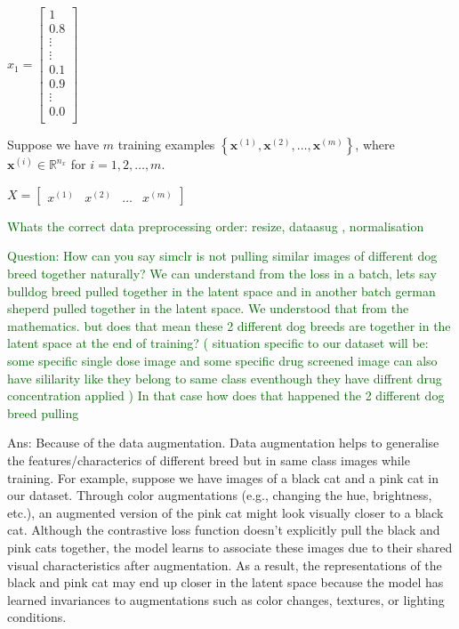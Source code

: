 \documentclass[12pt,twoside,a4paper,parskip]{scrbook} %
\begin{document}
\( x_1 =\left[\begin{array}{c}1 \\ 0.8 \\ \vdots \\ \vdots \\ 0.1 \\ 0.9 \\ \vdots\\ 0.0 \\\end{array}\right] \)

Suppose we have \( m \) training examples \( \left\{ \mathbf{x}^{(1)}, \mathbf{x}^{(2)}, \ldots, \mathbf{x}^{(m)} \right\} \), where \( \mathbf{x}^{(i)} \in \mathbb{R}^{n_{x}} \) for \( i = 1, 2, \ldots, m \).

\( X = \begin{bmatrix} x^{(1)} & x^{(2)} & \dots & x^{(m)} \end{bmatrix} \)

\textcolor{darkgreen}{Whats the correct data preprocessing order: resize, dataasug , normalisation}


\textcolor{darkgreen}{Question: How can you say simclr is not pulling similar images of different dog breed together naturally? We can understand from the loss in a batch, lets say bulldog breed pulled together in the latent space and in another batch german sheperd pulled together in the latent space. We understood that from the mathematics. but does that mean these 2 different dog breeds are together in the latent space at the end of training? ( situation specific to our dataset will be: some specific single dose image and some specific drug screened image can also have sililarity like they belong to same class eventhough they have diffrent drug concentration applied ) In that case how does that happened the 2 different dog breed pulling}

Ans: Because of the data augmentation. Data augmentation helps to generalise the features/characterics of different breed but in same class images while training. For example, suppose we have images of a black cat and a pink cat in our dataset. Through color augmentations (e.g., changing the hue, brightness, etc.), an augmented version of the pink cat might look visually closer to a black cat. Although the contrastive loss function doesn’t explicitly pull the black and pink cats together, the model learns to associate these images due to their shared visual characteristics after augmentation. As a result, the representations of the black and pink cat may end up closer in the latent space because the model has learned invariances to augmentations such as color changes, textures, or lighting conditions.
\end{document}
